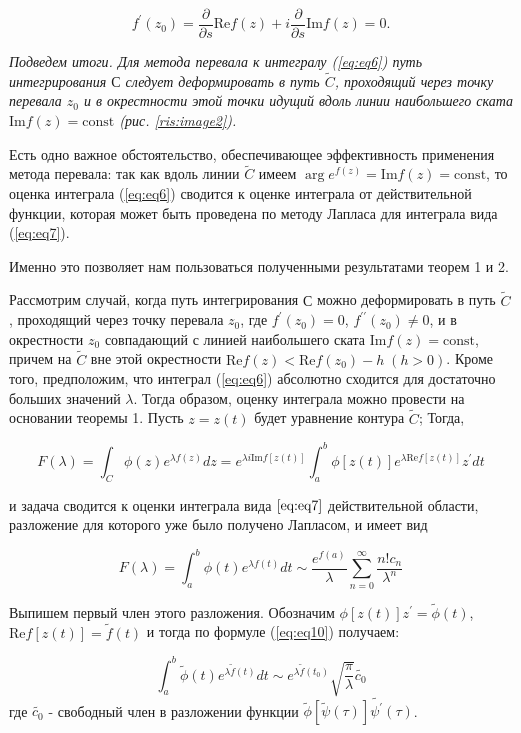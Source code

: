 \documentclass[14pt]{extarticle}
\renewcommand{\Re}{\mathrm{Re}}
\renewcommand{\Im}{\mathrm{Im}}
\newcommand{\const}{\mathrm{const}}
\begin{document}
	$$
	f^\prime(z_0) = \frac{\partial}{\partial s} \Re f(z) + i\frac{\partial}{\partial s} \Im f(z) = 0.
	$$ 
	
	\textit{Подведем итоги. Для метода перевала к интегралу (\ref{eq:eq6}) путь интегрирования $С$ следует деформировать в путь $\widetilde{C}$, проходящий через точку перевала $z_0$ и в окрестности этой точки идущий вдоль линии наибольшего ската $\Im f(z) = \const$ (рис. \ref{ris:image2}).}
	
	Есть одно важное обстоятельство, обеспечивающее эффективность применения метода перевала: так как вдоль линии $\widetilde{C}$ имеем $\arg e^{f(z)} = \Im f(z) = \const$, то оценка интеграла (\ref{eq:eq6}) сводится к оценке интеграла от действительной функции, которая может быть проведена по методу Лапласа для интеграла вида (\ref{eq:eq7}).  
	
	Именно это позволяет нам пользоваться полученными результатами теорем 1 и 2. 
	
	Рассмотрим  случай, когда путь интегрирования $С$ можно деформировать в путь $\widetilde{C}$, проходящий через точку перевала $z_0$, где $f^\prime(z_0) = 0$, $f^{\prime\prime}(z_0)\neq0$, и в окрестности $z_0$ совпадающий с линией наибольшего ската $\Im f(z) = \const$, причем на $\widetilde{C}$ вне этой окрестности $\Re f(z) < \Re f(z_0) - h \;(h> 0)$. Кроме того, предположим, что интеграл (\ref{eq:eq6}) абсолютно сходится для достаточно больших значений $\lambda$.
	Тогда образом, оценку интеграла можно провести на основании теоремы 1. Пусть $z = z(t)$ будет уравнение контура $\widetilde{C}$; Тогда,
	
	\begin{equation}\label{eq:eq11}
	F(\lambda) = \int_{C}^{}\phi(z) e^{\lambda f(z)}dz=e^{\lambda i \Im f[z(t)]}\int_{a}^{b}\phi[z(t)]e^{\lambda \Re f[z(t)]}z^{\prime} dt
	\end{equation}
	
	и задача сводится к оценки интеграла вида $\ref{eq:eq7}$ действительной области, разложение для которого уже было получено Лапласом, и имеет вид\cite{Lavrentyev}
	
	$$
	F(\lambda) = \int_{a}^{b}\phi(t)e^{\lambda f(t)}dt \sim \frac{e^{f(a)}}{\lambda}\sum_{n=0}^{\infty}\frac{n! c_n}{\lambda^n}
	$$
	
	Выпишем первый член этого разложения. Обозначим $\phi[z(t)]z^\prime = \widetilde{\phi}(t)$, $\Re f[z(t)] = \widetilde{f}(t)$ и тогда по формуле (\ref{eq:eq10}) получаем:
	
	\begin{equation}\label{eq:eq12}
	\int_{a}^{b} \widetilde{\phi}(t) e^{\lambda \widetilde{f}(t)}dt \sim e^{\lambda \widetilde{f}(t_0)} \sqrt{\frac{\pi}{\lambda}} \widetilde{c_0}
	\end{equation}
	где $\widetilde{c_0}$ - свободный член в разложении функции $\widetilde{\phi}[\widetilde{\psi}(\tau)]\widetilde{\psi^\prime}(\tau)$.
	
\end{document}
